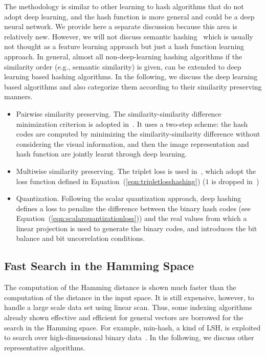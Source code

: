 \documentclass[10pt,journal,compsoc]{IEEEtran}
\begin{document}
The methodology is similar to other learning to hash algorithms
that do not adopt deep learning,
and the hash function is more general and could be a deep neural network.
We provide here a separate discussion because this area is relatively new.
However, we will not discuss semantic hashing~\cite{SalakhutdinovH07}
which is usually not thought as a feature learning approach
but just a hash function learning approach.
In general, almost all non-deep-learning hashing algorithms
if the similarity order (e.g., semantic similarity) is given,
can be extended to deep learning based hashing algorithms.
In the following,
we discuss the deep learning based algorithms
and also categorize them according to their similarity preserving manners.
\begin{itemize}
  \item Pairwise similarity preserving.
  The similarity-similarity difference minimization criterion
  is adopted in~\cite{XiaPLLY14}.
  It uses a two-step scheme:
  the hash codes are computed
  by minimizing the similarity-similarity difference
  without considering the visual information,
  and then the image representation and hash function
  are jointly learnt through deep learning.

  \item Multiwise similarity preserving. The triplet loss is used in~\cite{ZhaoHWT15,LaiPLY15},
which adopt the loss function defined in Equation~(\ref{eqn:tripletlosshashing})
($1$ is dropped in~\cite{LaiPLY15})
  \item Quantization. Following the scalar quantization approach,
deep hashing~\cite{LiongLWMZ15}
defines a loss to penalize the difference between the binary hash codes (see Equation~(\ref{eqn:scalarquantizationloss}))
and the real values from which a linear projection is used to generate the binary codes,
and introduces the bit balance and bit uncorrelation conditions.
\end{itemize}



\subsection{Fast Search in the Hamming Space}
The computation of the Hamming distance
is shown much faster
than the computation of the distance in the input space.
It is still expensive, however,
to handle a large scale data set
using linear scan.
Thus, some indexing algorithms
already shown effective and efficient for
general vectors
are borrowed for the search in the Hamming space.
For example,
min-hash, a kind of LSH,
is exploited to search over
high-dimensional binary data~\cite{ShrivastavaL12}.
In the following,
we discuss other representative algorithms.
\end{document}

